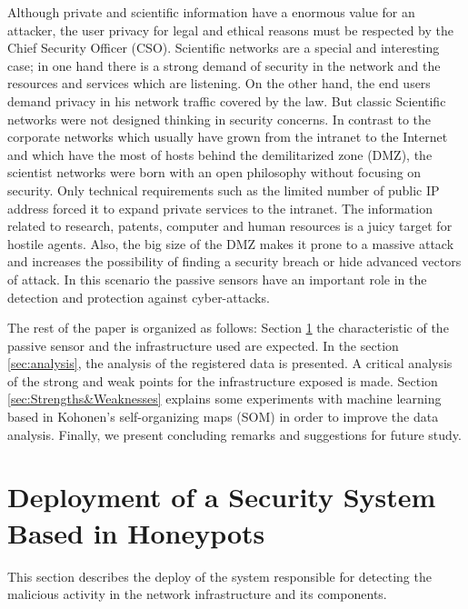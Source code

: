 \documentclass[a4paper]{llncs}
\begin{document}
Although private and scientific information have a enormous value for an attacker, the user privacy for legal and ethical reasons must be respected by the Chief Security Officer (CSO). Scientific networks are a special and interesting case; in one hand there is a strong demand of security in the network and the resources and services which are listening. On the other hand, the end users demand privacy in his network traffic covered by the law. But classic Scientific networks were not designed thinking in security concerns\cite{iris-proyecto}. In contrast to the corporate networks which usually have grown from the intranet to the Internet and which have the most of hosts behind the demilitarized zone (DMZ), the scientist networks were born with an open philosophy without focusing on security\cite{iris-proyecto}. Only technical requirements such as the limited number of public IP address forced it to expand private services to the intranet. The information related to research, patents, computer and human resources is a juicy target for hostile agents. Also, the big size of the DMZ makes it prone to a massive attack and increases the possibility of finding a security breach or hide advanced vectors of attack. In this scenario the passive sensors have an important role in the detection and protection against cyber-attacks.

The rest of the paper is organized as follows: Section \ref{sec:deployment} the characteristic of the passive sensor and the infrastructure used are expected. In the section \ref{sec:analysis}, the analysis of the registered data is presented. A critical analysis of the strong and weak points for the infrastructure exposed is made. Section \ref{sec:Strengths&Weaknesses} explains some experiments with machine learning based in Kohonen's self-organizing maps (SOM)\cite{kohonen-1990} in order to improve the data analysis. Finally, we present concluding remarks and suggestions for future study.


\section{Deployment of a Security System Based in Honeypots}
\label{sec:deployment}
This section describes the deploy of the system responsible for detecting the malicious activity in the network infrastructure and its components.
\end{document}
